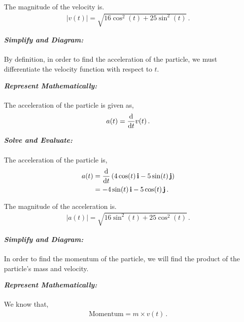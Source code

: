 \begin{subquestions}
\begin{subsubquestions}
The magnitude of the velocity is.
\begin{align}
	|v(t)| = \sqrt{16\cos^2(t)+25\sin^2(t)} \,. 
\end{align}
 

\subsubquestion

\textbf{\textit{Simplify and Diagram:}} \\ \\
By definition, in order to find the acceleration of the particle, we must differentiate the velocity function with respect to $t$.




\textbf{\textit{Represent Mathematically:}} \\ \\
The acceleration of the particle is given as,
\begin{equation}
	a(t) = \frac{\mathrm{d}}{\mathrm{d}t} v(t) \,.
\end{equation}




\textbf{\textit{Solve and Evaluate:}} \\ \\
The acceleration of the particle is,
\begin{align}
	a(t) & = \frac{\mathrm{d}}{\mathrm{d}t} \left(4\cos(t) \,\mathbf{i} -5\sin(t)\,\mathbf{j} \right) \nonumber \\
	& = -4\sin(t)\,\mathbf{i} - 5\cos(t)\,\mathbf{j} \,.
\end{align}

The magnitude of the acceleration is.
\begin{align}
	|a(t)| = \sqrt{16\sin^2(t)+25\cos^2(t)} \,. 
\end{align}


\subsubquestion

\textbf{\textit{Simplify and Diagram:}} \\ \\
In order to find the momentum of the particle, we will find the product of the particle's mass and velocity.




\textbf{\textit{Represent Mathematically:}} \\ \\
We know that,
\begin{align}
	\text{Momentum} = m \times v(t) \,.
\end{align}





\end{subsubquestions}
\end{subquestions}
